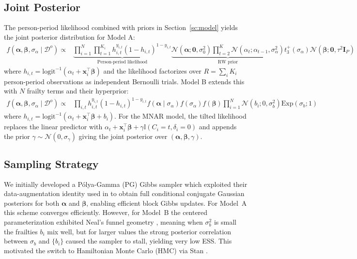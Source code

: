 \documentclass[twoside,11pt]{article}
\newcommand{\ind}{\mathbb{I}}
\newcommand{\bx}{\mathbf{x}}
\begin{document}
\subsection{Joint Posterior}
The person-period likelihood combined with priors in Section~\ref{sc:model} yields the joint posterior distribution for Model A:
\begin{align*}
    f(\boldsymbol{\alpha}, \boldsymbol{\beta}, \sigma_\alpha \mid \mathcal{D}^o) 
    \propto&
    \underbrace{ 
        \prod_{i=1}^N \prod_{t=1}^{K_i} h_{i,t}^{y_{i,t}} (1 - h_{i,t})^{1-y_{i,t}} 
    }_{\text{Person-period likelihood}}
    \underbrace{ 
        \mathcal{N}(\boldsymbol{\alpha}; \mathbf{0}, \sigma_0^2) \prod_{t=2}^K \mathcal{N}(\alpha_t; \alpha_{t-1}, \sigma_\alpha^2)
    }_{\text{RW prior}} 
    t_3^+ (\sigma_\alpha) \mathcal{N}(\boldsymbol{\beta} ; \mathbf{0}, \tau^2 \mathbf{I}_P) 
\end{align*} 
where \(h_{i,t} = \text{logit}^{-1}(\alpha_t + \bx_i^\top \boldsymbol{\beta})\) and the likelihood factorizes over \(R = \sum_{i} K_i\) person-period observations as independent Bernoulli trials. Model B extends this with \(N\) frailty terms and their hyperprior:
\begin{align*}
    f(\boldsymbol{\alpha}, \boldsymbol{\beta}, \sigma_\alpha \mid \mathcal{D}^o) 
    \propto&
    \prod_{i,t} h_{i,t}^{y_{i,t}} (1 - h_{i,t})^{1-y_{i,t}} 
    f(\boldsymbol{\alpha} \mid \sigma_\alpha) 
    f(\sigma_\alpha)
    f(\boldsymbol{\beta}) 
    \prod_{i=1}^N \mathcal{N}(b_i; 0, \sigma_b^2) \mathrm{Exp}(\sigma_b; 1)
\end{align*}
where \(h_{i,t} = \text{logit}^{-1}(\alpha_t + \bx_i^\top \boldsymbol{\beta} + b_i)\). For the MNAR model, the tilted likelihood replaces the linear predictor with \(\alpha_t + \bx_i^\top \boldsymbol{\beta} + \gamma \ind(C_i = t, \delta_i = 0)\) and appends the prior \(\gamma \sim \mathcal{N}(0, \sigma_\gamma)\) giving the joint posterior over \((\boldsymbol{\alpha}, \boldsymbol{\beta}, \gamma)\).
 
\subsection{Sampling Strategy}\label{sc:sampling}
We initially developed a P\'olya-Gamma (PG) Gibbs sampler which exploited their data-augmentation identity used in \citet{polya-gamma} to obtain full conditional conjugate Gaussian posteriors for both $\boldsymbol{\alpha}$ and $\boldsymbol{\beta}$, enabling efficient block Gibbs updates. For Model~A this scheme converges efficiently. However, for Model~B the centered parameterization exhibited Neal's funnel geometry \citep{neal-funnel}, meaning when $\sigma_b^2$ is small the frailties $b_i$ mix well, but for larger values the strong posterior correlation between $\sigma_b$ and $\{b_i\}$ caused the sampler to stall, yielding very low ESS. This motivated the switch to Hamiltonian Monte Carlo (HMC) via Stan \citep{stan-software}.
 
\end{document}
